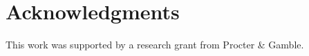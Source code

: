 \documentclass[10pt,letterpaper]{article}
\begin{document}
\section*{Acknowledgments}

This work was supported by a research grant from Procter \& Gamble.

\end{document}
